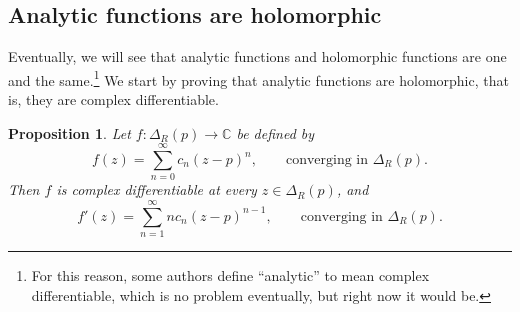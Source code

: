 \documentclass[12pt,openany]{book}
\newcommand{\C}{{\mathbb{C}}}
\newcommand{\myquote}[1]{``#1''}
\theoremstyle{plain}
\newtheorem{prop}[thm]{Proposition}
\theoremstyle{remark}
\theoremstyle{definition}
\theoremstyle{exercise}
\theoremstyle{example}
\begin{document}
\subsection{Analytic functions are holomorphic}

Eventually, we will see that analytic functions and holomorphic functions are
one and the same.\footnote{%
For this reason, some authors define \myquote{analytic} to mean complex differentiable,
which is no problem eventually, but right now it would be.}
We start by proving that
analytic functions are holomorphic, that is, they are complex
differentiable.

\begin{prop}
\pagebreak[2]
Let $f \colon \Delta_R(p) \to \C$ be defined by
\begin{equation*}
f(z) = \sum_{n=0}^\infty c_n {(z-p)}^n ,
\qquad \text{converging in } \Delta_R(p) .
\end{equation*}
Then $f$ is complex differentiable at every $z \in \Delta_R(p)$, and
\begin{equation*}
f'(z) = \sum_{n=1}^\infty n c_n {(z-p)}^{n-1} ,
\qquad \text{converging in } \Delta_R(p) .
\end{equation*}
\end{prop}
\end{document}
